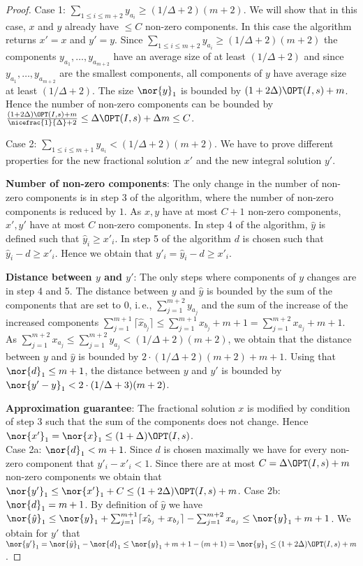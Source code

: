\begin{proof}
    Case 1: $\sum_{1\leq i \leq m+2} y_{a_i} \geq (1/ \Delta +2)(m+2)$. We will show that in this case, $x$ and $y$ already have $\leq C$ non-zero components. In this case the algorithm returns $x' = x$ and $y' =y$. Since $\sum_{1\leq i \leq m+2} y_{a_i} \geq (1/ \Delta +2)(m+2)$ the components $y_{a_1}, \ldots , y_{a_{m+2}}$ have an average size of at least $(1/ \Delta +2)$ and since $y_{a_1}, \ldots , y_{a_{m+2}}$ are the smallest components, all components of $y$ have average size at least $(1/ \Delta +2)$. The size $\nor{y}_1$ is bounded by $(1+ 2\Delta) \OPT(I,s)+m$. Hence the number of non-zero components can be bounded by $\frac{(1+ 2\Delta) \OPT(I,s)+m}{\nicefrac{1}{\Delta}+2} \leq \Delta \OPT(I,s)+ \Delta m \leq C$.

Case 2: $\sum_{1\leq i \leq m+1} y_{a_i} < (1/ \Delta +2)(m+2)$. We have to prove different properties for the new fractional solution $x'$ and the new integral solution $y'$.

\textbf{Number of non-zero components}: The only change in the number of non-zero components is in step 3 of the algorithm, where the number of non-zero components is reduced by $1$. As $x,y$ have at most $C+1$ non-zero components, $x',y'$ have at most $C$ non-zero components. In step 4 of the algorithm, $\hat{y}$ is defined such that $\hat{y}_i \geq x'_i$. In step 5 of the algorithm $d$ is chosen such that $\hat{y}_i -d \geq x'_i$. Hence we obtain that $y'_i = \hat{y}_i -d \geq x'_i$.

\textbf{Distance between $y$ and $y'$}: The only steps where components of $y$ changes are in step 4 and 5. The distance between $y$ and $\hat{y}$ is bounded by the sum of the components that are set to $0$, i.\,e., $\sum_{j=1}^{m+2}y_{a_{j}}$ and the sum of the increase of the increased components $\sum_{j=1}^{m+1}\lceil \hat{x}_{b_{j}}\rceil \leq \sum_{j=1}^{m+1}\hat{x}_{b_{j}} +m+1 = \sum_{j=1}^{m+2}x_{a_{j}} +m+1$. As $\sum_{j=1}^{m+2}x_{a_{j}}\leq \sum_{j=1}^{m+2}y_{a_{j}} < (1/ \Delta +2)(m+2)$, we obtain that the distance between $y$ and $\hat{y}$ is bounded by $2\cdot (1/\Delta +2)(m+2)+m+1$. Using that $\nor{d}_1 \leq m+1$, the distance between $y$ and $y'$ is bounded by $\nor{y'-y}_1 < 2\cdot (1/\Delta +3) (m+2)$.

\textbf{Approximation guarantee}: The fractional solution $x$ is modified by condition of step 3 such that the sum of the components does not change. Hence $\nor{x'}_1=\nor{x}_1\leq (1+\Delta)\OPT(I,s)$.\\
Case 2a: $\nor{d}_1 < m+1$. Since $d$ is chosen maximally we have for every non-zero component that $y'_i-x'_i <1$. Since there are at most $C=\Delta\OPT(I,s)+m$ non-zero components we obtain that $\nor{y'}_1 \leq \nor{x'}_1 + C \leq (1+ 2\Delta)\OPT(I,s)+m$.
Case 2b: $\nor{d}_1 = m+1$.
By definition of $\hat{y}$ we have $\nor{\hat{y}}_1 \leq \nor{y}_1 + \sum_{j=1}^{m+1} \lceil \hat{x_{b_j}}+x_{b_j}\rceil  - \sum_{j=1}^{m+2}x_{a_j}  \leq \nor{y}_1 + m+1$. We obtain for $y'$ that $\nor{y'}_1 = \nor{\hat{y}}_1 - \nor{d}_1 \leq \nor{y}_1 + m+1 - (m+1) =\nor{y}_1 \leq (1+ 2\Delta) \OPT(I,s)+m$.
\end{proof}

